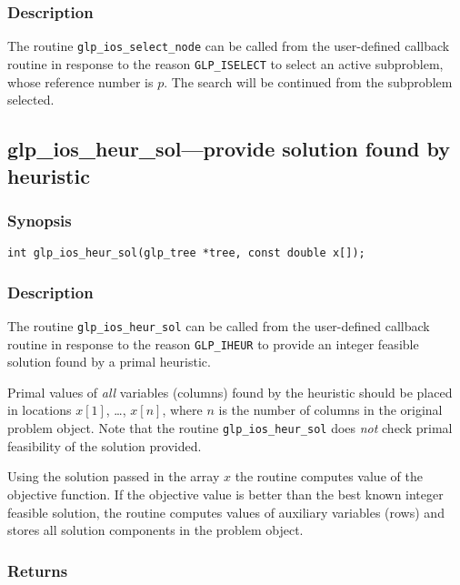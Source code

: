 \subsubsection*{Description}

The routine \verb|glp_ios_select_node| can be called from the
user-defined callback routine in response to the reason
\verb|GLP_ISELECT| to select an active subproblem, whose reference
number is $p$. The search will be continued from the subproblem
selected.

\newpage

\subsection{glp\_ios\_heur\_sol---provide solution found by heuristic}

\subsubsection*{Synopsis}

\begin{verbatim}
int glp_ios_heur_sol(glp_tree *tree, const double x[]);
\end{verbatim}

\subsubsection*{Description}

The routine \verb|glp_ios_heur_sol| can be called from the user-defined
callback routine in response to the reason \verb|GLP_IHEUR| to provide
an integer feasible solution found by a primal heuristic.

Primal values of {\it all} variables (columns) found by the heuristic
should be placed in locations $x[1]$, \dots, $x[n]$, where $n$ is the
number of columns in the original problem object. Note that the routine
\verb|glp_ios_heur_sol| does {\it not} check primal feasibility of the
solution provided.

Using the solution passed in the array $x$ the routine computes value
of the objective function. If the objective value is better than the
best known integer feasible solution, the routine computes values of
auxiliary variables (rows) and stores all solution components in the
problem object.

\subsubsection*{Returns}

